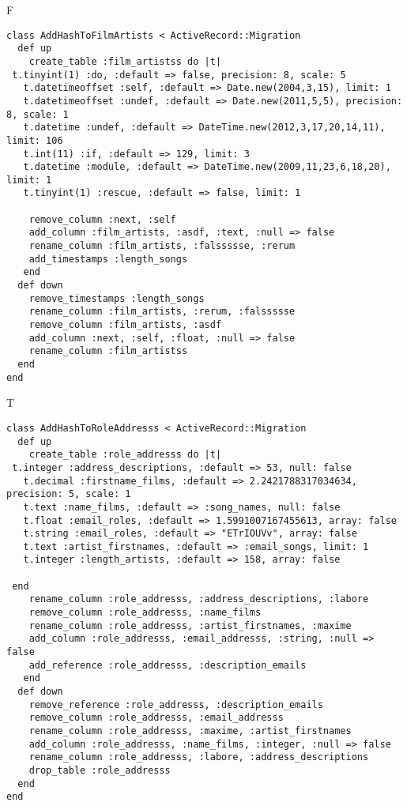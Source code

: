 F
\begin{verbatim}
class AddHashToFilmArtists < ActiveRecord::Migration
  def up
    create_table :film_artistss do |t| 
 t.tinyint(1) :do, :default => false, precision: 8, scale: 5
   t.datetimeoffset :self, :default => Date.new(2004,3,15), limit: 1
   t.datetimeoffset :undef, :default => Date.new(2011,5,5), precision: 8, scale: 1
   t.datetime :undef, :default => DateTime.new(2012,3,17,20,14,11), limit: 106
   t.int(11) :if, :default => 129, limit: 3
   t.datetime :module, :default => DateTime.new(2009,11,23,6,18,20), limit: 1
   t.tinyint(1) :rescue, :default => false, limit: 1

    remove_column :next, :self
    add_column :film_artists, :asdf, :text, :null => false
    rename_column :film_artists, :falssssse, :rerum
    add_timestamps :length_songs
   end
  def down
    remove_timestamps :length_songs
    rename_column :film_artists, :rerum, :falssssse
    remove_column :film_artists, :asdf
    add_column :next, :self, :float, :null => false
    rename_column :film_artistss
  end
end
\end{verbatim}

T
\begin{verbatim}
class AddHashToRoleAddresss < ActiveRecord::Migration
  def up
    create_table :role_addresss do |t|
 t.integer :address_descriptions, :default => 53, null: false
   t.decimal :firstname_films, :default => 2.2421788317034634, precision: 5, scale: 1
   t.text :name_films, :default => :song_names, null: false
   t.float :email_roles, :default => 1.5991007167455613, array: false
   t.string :email_roles, :default => "ETrIOUVv", array: false
   t.text :artist_firstnames, :default => :email_songs, limit: 1
   t.integer :length_artists, :default => 158, array: false

 end
    rename_column :role_addresss, :address_descriptions, :labore
    remove_column :role_addresss, :name_films
    rename_column :role_addresss, :artist_firstnames, :maxime
    add_column :role_addresss, :email_addresss, :string, :null => false
    add_reference :role_addresss, :description_emails
   end
  def down
    remove_reference :role_addresss, :description_emails
    remove_column :role_addresss, :email_addresss
    rename_column :role_addresss, :maxime, :artist_firstnames
    add_column :role_addresss, :name_films, :integer, :null => false
    rename_column :role_addresss, :labore, :address_descriptions
    drop_table :role_addresss
  end
end
\end{verbatim}

